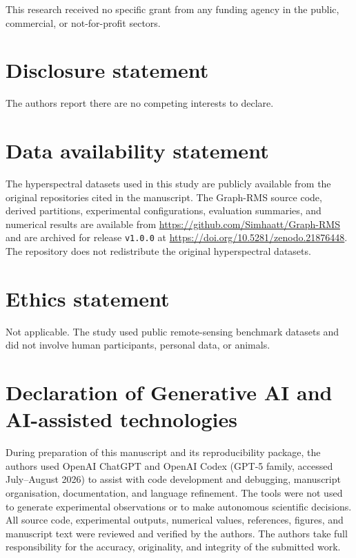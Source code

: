 \documentclass[10pt,a4paper,fleqn]{article}
\begin{document}
This research received no specific grant from any funding agency in the
public, commercial, or not-for-profit sectors.

\section*{Disclosure statement}

The authors report there are no competing interests to declare.


\section*{Data availability statement}

The hyperspectral datasets used in this study are publicly available from the
original repositories cited in the manuscript. The Graph-RMS source code,
derived partitions, experimental configurations, evaluation summaries, and
numerical results are available from
\url{https://github.com/Simhaatt/Graph-RMS} and are archived for release
\texttt{v1.0.0} at \url{https://doi.org/10.5281/zenodo.21876448}. The
repository does not redistribute the original hyperspectral datasets.

\section*{Ethics statement}

Not applicable. The study used public remote-sensing benchmark datasets and
did not involve human participants, personal data, or animals.

\section*{Declaration of Generative AI and AI-assisted technologies}

During preparation of this manuscript and its reproducibility package, the
authors used OpenAI ChatGPT and OpenAI Codex (GPT-5 family, accessed
July--August 2026) to assist with code development and debugging, manuscript
organisation, documentation, and language refinement. The tools were not used
to generate experimental observations or to make autonomous scientific
decisions. All source code, experimental outputs, numerical values,
references, figures, and manuscript text were reviewed and verified by the
authors. The authors take full responsibility for the accuracy, originality,
and integrity of the submitted work.



\end{document}
